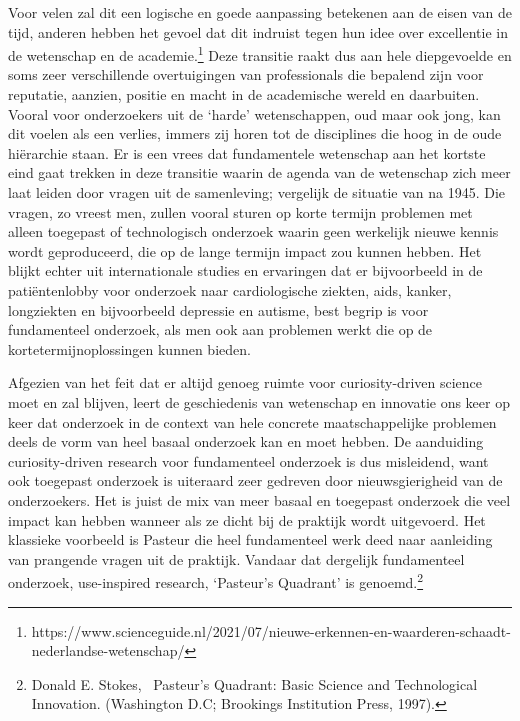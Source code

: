 \documentclass[empirical, authordate, ]{new-jote-article}
\begin{document}
	Voor velen zal dit een logische en goede aanpassing betekenen aan de eisen van de tijd, anderen hebben het gevoel dat dit indruist tegen hun idee over excellentie in de wetenschap en de academie.\footnote{https://www.scienceguide.nl/2021/07/nieuwe-erkennen-en-waarderen-schaadt-nederlandse-wetenschap/} Deze transitie raakt dus aan hele diepgevoelde en soms zeer verschillende overtuigingen van professionals die bepalend zijn voor reputatie, aanzien, positie en macht in de academische wereld en daarbuiten. Vooral voor onderzoekers uit de ‘harde' wetenschappen, oud maar ook jong, kan dit voelen als een verlies, immers zij horen tot de disciplines die hoog in de oude hiërarchie staan. Er is een vrees dat fundamentele wetenschap aan het kortste eind gaat trekken in deze transitie waarin de agenda van de wetenschap zich meer laat leiden door vragen uit de samenleving; vergelijk de situatie van na 1945. Die vragen, zo vreest men, zullen vooral sturen op korte termijn problemen met alleen toegepast of technologisch onderzoek waarin geen werkelijk nieuwe kennis wordt geproduceerd, die op de lange termijn impact zou kunnen hebben. Het blijkt echter uit internationale studies en ervaringen dat er bijvoorbeeld in de patiëntenlobby voor onderzoek naar cardiologische ziekten, aids, kanker, longziekten en bijvoorbeeld depressie en autisme, best begrip is voor fundamenteel onderzoek, als men ook aan problemen werkt die op de kortetermijnoplossingen kunnen bieden.



	Afgezien van het feit dat er altijd genoeg ruimte voor curiosity-driven science moet en zal blijven, leert de geschiedenis van wetenschap en innovatie ons keer op keer dat onderzoek in de context van hele concrete maatschappelijke problemen deels de vorm van heel basaal onderzoek kan en moet hebben. De aanduiding curiosity-driven research voor fundamenteel onderzoek is dus misleidend, want ook toegepast onderzoek is uiteraard zeer gedreven door nieuwsgierigheid van de onderzoekers. Het is juist de mix van meer basaal en toegepast onderzoek die veel impact kan hebben wanneer als ze dicht bij de praktijk wordt uitgevoerd. Het klassieke voorbeeld is Pasteur die heel fundamenteel werk deed naar aanleiding van prangende vragen uit de praktijk. Vandaar dat dergelijk fundamenteel onderzoek, use-inspired research, ‘Pasteur's Quadrant' is genoemd.\footnote{Donald E. Stokes,  Pasteur's Quadrant: Basic Science and Technological Innovation. (Washington D.C; Brookings Institution Press, 1997).}
\end{document}
